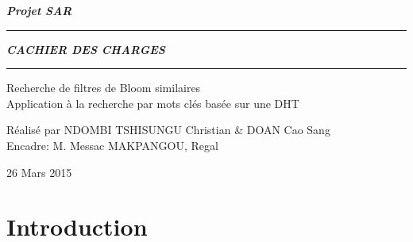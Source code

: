 \documentclass[a4paper,12pt]{report}
\begin{document}
	\begin{titlepage}
		\begin{center}
			\large\bfseries\itshape Projet SAR\\
		\end{center}
		\noindent\rule{\linewidth}{3pt}

		\begin{center}
			\Huge\bfseries\itshape CACHIER DES CHARGES\\
		\end{center}
		
		\noindent\rule{\linewidth}{3pt}
		\begin{center}
			\large Recherche de filtres de Bloom similaires \\
			\large Application à la recherche par mots clés basée sur une DHT
		\end{center}
		\begin{center}
			Réalisé par NDOMBI TSHISUNGU Christian \& DOAN Cao Sang \\
			Encadre: M. Messac MAKPANGOU, Regal
		\end{center}
		\begin{center}
			26 Mars 2015
		\end{center}
	\end{titlepage}

\tableofcontents

\chapter{Introduction}
\end{document}

